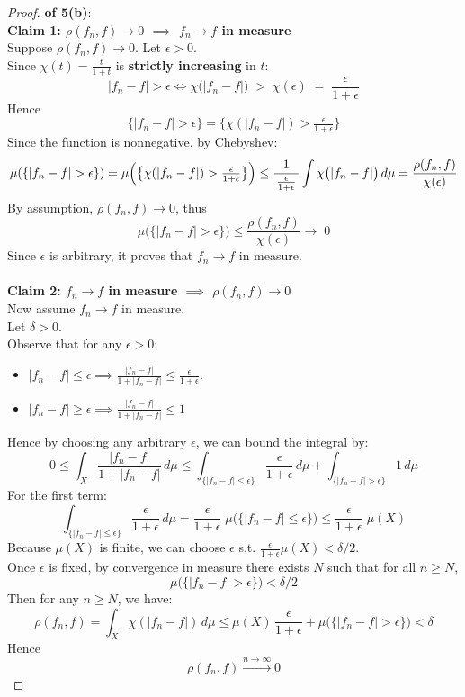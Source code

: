 \documentclass[lang=cn,11pt]{elegantbook}
\begin{document}
\begin{proof}
   \textbf{ of 5(b)}: \\
\textbf{Claim 1: \(\rho(f_n,f)\to 0\) \(\implies\) \(f_n\to f\) in measure}\\
Suppose \(\rho(f_n,f)\to 0\).  Let $\epsilon > 0$.\\
Since \(\chi(t)=\tfrac{t}{1+t}\) is\textbf{ strictly increasing} in \(t\): \[
    |f_n-f|> \epsilon \Longleftrightarrow 
    \chi\bigl(|f_n-f|\bigr) \;>\; \chi(\epsilon)\;=\;\frac{\epsilon}{1+\epsilon}
  \]
Hence \[
    \{|f_n-f| > \epsilon\} = \bigl\{\chi(|f_n-f|) > \tfrac{\epsilon}{1+\epsilon}\bigr\}
  \]
Since the function is nonnegative, by Chebyshev:\[
 \mu(  \{|f_n-f| > \epsilon\} ) =    \mu\Bigl(\bigl\{\chi(|f_n-f|)>\tfrac{\epsilon}{1+\epsilon}\bigr\}\Bigr) \leq 
    \frac{1}{\,\tfrac{\epsilon}{1+\epsilon}\,}
    \int\chi\bigl(|f_n-f|\bigr)\,d\mu =  \frac{\rho(f_n,f)}{\chi(\epsilon)}
  \]
By assumption, $\rho(f_n,f) \to 0$, thus \[
    \mu\bigl(\{|f_n-f|>\epsilon\}\bigr) \leq 
    \frac{\rho(f_n,f)}{\chi(\epsilon)}\longrightarrow\;0
  \]
Since $\epsilon$ is arbitrary, it proves that \(f_n\to f\) in measure.\\\\

\textbf{Claim 2: \(f_n\to f\) in measure \(\implies\) \(\rho(f_n,f)\to0\)}\\
Now assume \(f_n\to f\) in measure. \\
Let $\delta > 0$.\\
Observe that for any \(\epsilon>0\): 
\begin{itemize}
    \item \(|f_n-f|\le \epsilon \implies  \tfrac{|f_n-f|}{1+|f_n-f|}\le \tfrac{\epsilon}{1+\epsilon}\).
    \item \(|f_n-f|\ge \epsilon \implies  \tfrac{|f_n-f|}{1+|f_n-f|}\leq 1 \)
\end{itemize}
Hence by choosing any arbitrary $\epsilon$, we can bound the integral by: \[
  0  \leq  \int_X \frac{|f_n-f|}{1+|f_n-f|}\,d\mu \leq
  \int_{\{|f_n-f|\le \epsilon\}} \frac{\epsilon}{1+\epsilon}\, d\mu +
  \int_{\{|f_n-f|> \epsilon\}} 1 \,d\mu
\]
For the first term:
\[
  \int_{\{|f_n-f|\le \epsilon\}} \frac{\epsilon}{1+\epsilon}\, d\mu = 
  \frac{\epsilon}{1+\epsilon}\;\mu\bigl(\{|f_n-f|\le \epsilon\}\bigr) \leq
  \frac{\epsilon}{1+\epsilon}\;\mu(X)
\]
Because \(\mu(X)\) is finite, we can choose $\epsilon$ s.t. \(\tfrac{\epsilon}{1+\epsilon}\mu(X) < \delta / 2\).\\
Once \(\epsilon\) is fixed, by convergence in measure there exists \(N\) such that for all \(n\ge N\),
\[
  \mu\bigl(\{|f_n-f|> \epsilon\}\bigr) < \delta /2
\]
Then for any $n\geq N$, we have:
\[
  \rho(f_n,f) = 
  \int_X \chi(|f_n-f|)\,d\mu \leq
  \mu(X)\,\frac{\epsilon}{1+\epsilon}  +
  \mu\bigl(\{|f_n-f|> \epsilon\}\bigr) < \delta
\]
 Hence \[\rho(f_n,f)\overset{n\to \infty}{\longrightarrow} 0\]
\end{proof}
\end{document}
